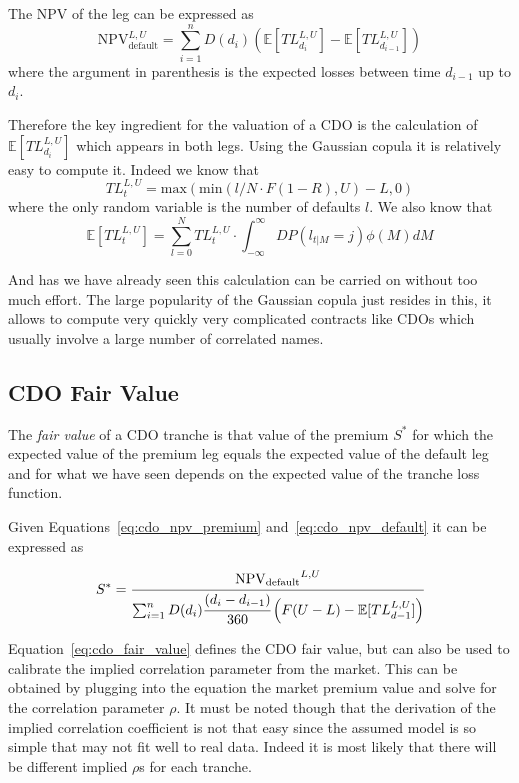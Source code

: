 The NPV of the leg can be expressed as
\begin{equation}
\mathrm{NPV}_{\mathrm{default}}^{L,U}=\sum_{i=1}^{n}D(d_i)\left(\mathbb{E}[TL_{d_i}^{L,U}]-\mathbb{E}[TL_{d_{i-1}}^{L,U}]\right)
\label{eq:cdo_npv_default}
\end{equation}
where the argument in parenthesis is the expected losses between time $d_{i-1}$ up to $d_i$. 

Therefore the key ingredient for the valuation of a CDO is the calculation of $\mathbb{E}[TL_{d_i}^{L,U}]$ which appears in both legs.
Using the Gaussian copula it is relatively easy to compute it. 
Indeed we know that 
\begin{equation}
TL_{t}^{L,U}=\mathrm{max}(\mathrm{min}(l/N\cdot F(1-R), U)-L, 0)
\label{eq:tl}
\end{equation}
where the only random variable is the number of defaults $l$. We also know that 
\begin{equation}
\mathbb{E}[TL_{t}^{L,U}] = \sum_{l=0}^{N}TL_{t}^{L,U}\cdot \int_{-\infty}^{\infty} DP(l_{t|M}=j) \phi(M)dM
\label{eq:etl}
\end{equation}

And has we have already seen this calculation can be carried on without too much effort.
The large popularity of the Gaussian copula just resides in this, it allows to compute very quickly very complicated contracts like CDOs which usually involve a large number of correlated names.

\subsection{CDO Fair Value}
The \emph{fair value} of a CDO tranche is that value of the premium $S^*$ for which the expected value of the premium leg equals the expected value of the default leg and for what we have seen depends on the expected value of the tranche loss function.

Given Equations~\ref{eq:cdo_npv_premium} and~\ref{eq:cdo_npv_default} it can be expressed as

\begin{equation}
S^* = \cfrac{\mathrm{NPV_{default}}^{L,U}}{\sum^{n}_{i=1}D(d_i)\cfrac{(d_i - d_{i-1})}{360}\left(F(U-L)-\mathbb{E}[TL_{d-1}^{L,U}]\right)}
\label{eq:cdo_fair_value}
\end{equation}

Equation~\ref{eq:cdo_fair_value} defines the CDO fair value, but can also be used to calibrate the implied correlation parameter from the market.
This can be obtained by plugging into the equation the market premium value and solve for the correlation parameter $\rho$.
It must be noted though that the derivation of the implied correlation coefficient is not that easy since the assumed model is so simple that may not fit well to real data. Indeed it is most likely that there will be different implied $\rho$s for each tranche.

